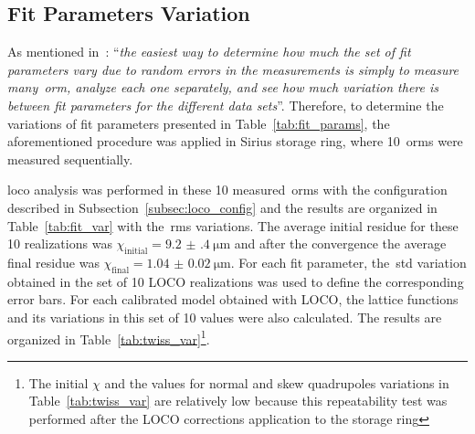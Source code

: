 \subsection{Fit Parameters Variation}\label{subsec:fit_var}
As mentioned in~\cite{safranek1997}: ``\textit{the easiest way to determine how much the set of fit parameters vary due to random errors in the measurements is simply to measure many~\gls{orm}, analyze each one separately, and see how much variation there is between fit parameters for the different data sets}''. Therefore, to determine the variations of fit parameters presented in Table~\ref{tab:fit_params}, the aforementioned procedure was applied in Sirius storage ring, where 10~\glspl{orm} were measured sequentially. 

\gls{loco} analysis was performed in these 10 measured~\glspl{orm} with the configuration described in Subsection~\ref{subsec:loco_config} and the results are organized in Table~\ref{tab:fit_var} with the~\gls{rms} variations. The average initial residue for these 10 realizations was $\chi_{\mathrm{initial}} = \SI{9.2(4)}{\micro\meter}$ and after the convergence the average final residue was $\chi_{\mathrm{final}} = \SI{1.04(2)}{\micro\meter}$. For each fit parameter, the~\gls{std} variation obtained in the set of 10 LOCO realizations was used to define the corresponding error bars. For each calibrated model obtained with LOCO, the lattice functions and its variations in this set of 10 values were also calculated. The results are organized in Table~\ref{tab:twiss_var}\footnote{The initial $\chi$ and the values for normal and skew quadrupoles variations in Table~\ref{tab:twiss_var} are relatively low because this repeatability test was performed after the LOCO corrections application to the storage ring}. 
